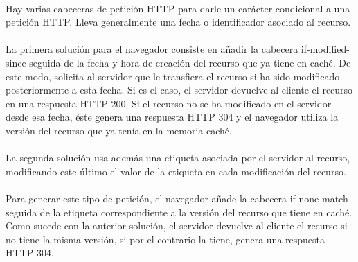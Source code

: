 \documentclass{article}
\begin{document}
	\paragraph{}Hay varias cabeceras de petición HTTP para darle un carácter condicional a una petición HTTP. Lleva generalmente una fecha o identificador asociado al recurso.
	\paragraph{}La primera solución para el navegador consiste en añadir la cabecera if-modified-since seguida de la fecha y hora de creación del recurso que ya tiene en caché. De este modo, solicita al servidor que le transfiera el recurso si ha sido modificado posteriormente a esta fecha. Si es el caso, el servidor devuelve al cliente el recurso en una respuesta HTTP 200. Si el recurso no se ha modificado en el servidor desde esa fecha, éste genera una respuesta HTTP 304 y el navegador utiliza la versión del recurso que ya tenía en la memoria caché.
	
	\paragraph{}La segunda solución usa además una etiqueta asociada por el servidor al recurso, modificando este último el valor de la etiqueta en cada modificación del recurso.
	
	\paragraph{}Para generar este tipo de petición, el navegador añade la cabecera if-none-match seguida de la etiqueta correspondiente a la versión del recurso que tiene en caché. Como sucede con la anterior solución, el servidor devuelve al cliente el recurso si no tiene la misma versión, si por el contrario la tiene, genera una respuesta HTTP 304.
	
\end{document}
